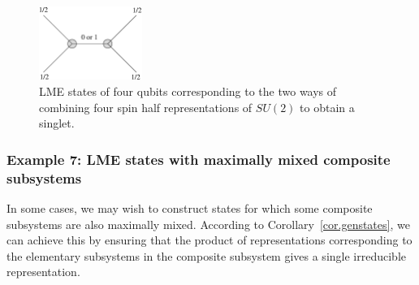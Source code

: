 \documentclass[12pt]{article}
\theoremstyle{definition}
\begin{document}
\begin{figure}
\centering
\includegraphics[width=0.3\textwidth]{qubit4simple.eps}
\caption{LME states of four qubits corresponding to the two ways of combining four spin half representations of $SU(2)$ to obtain a singlet.}
\label{qubit4simple}
\end{figure}


\subsubsection*{Example 7: LME states with maximally mixed composite subsystems}

In some cases, we may wish to construct states for which some composite subsystems are also maximally mixed. According to Corollary~\ref{cor.genstates}, we can achieve this by ensuring that the product of representations corresponding to the elementary subsystems in the composite subsystem gives a single irreducible representation.
\end{document}
